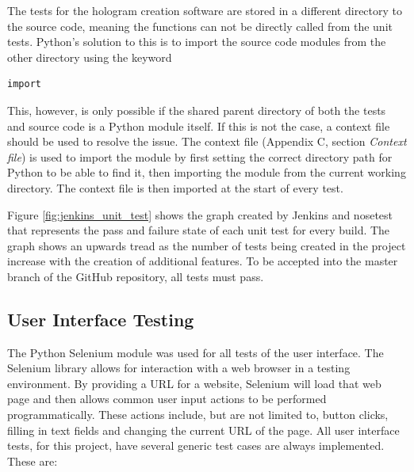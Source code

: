 The tests for the hologram creation software are stored in a different directory to the source code, meaning the functions can not be directly called from the unit tests. Python's solution to this is to import the source code modules from the other directory using the keyword
\begin{verbatim}
import
\end{verbatim}
This, however, is only possible if the shared parent directory of both the tests and source code is a Python module itself. If this is not the case, a context file should be used to resolve the issue. The context file (Appendix C, section \textit{Context file}) is used to import the module by first setting the correct directory path for Python to be able to find it, then importing the module from the current working directory. The context file is then imported at the start of every test.

Figure \ref{fig:jenkins_unit_test} shows the graph created by Jenkins and nosetest that represents the pass and failure state of each unit test for every build. The graph shows an upwards tread as the number of tests being created in the project increase with the creation of additional features. To be accepted into the master branch of the GitHub repository, all tests must pass.

\begin{figure}[h!]
\end{figure}

\subsection{User Interface Testing}
The Python Selenium module was used for all tests of the user interface. The Selenium library allows for interaction with a web browser in a testing environment. By providing a URL for a website, Selenium will load that web page and then allows common user input actions to be performed programmatically. These actions include, but are not limited to, button clicks, filling in text fields and changing the current URL of the page. All user interface tests, for this project, have several generic test cases are always implemented. These are:

